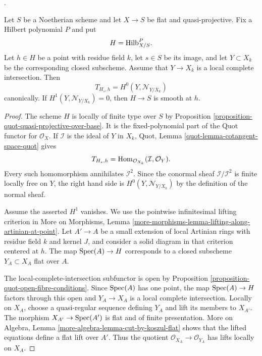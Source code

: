 \begin{proposition}
\label{proposition-hilbert-lci-tangent-smooth}
\begin{reference}
\cite[Expos\'e 221, Corollaries 5.3 and 5.4]{FGA}.
\end{reference}
Let $S$ be a Noetherian scheme and let $X \to S$ be flat and
quasi-projective. Fix a Hilbert polynomial $P$ and put
$$
H = \mathrm{Hilb}^P_{X/S}.
$$
Let $h \in H$ be a point with residue field $k$, let $s \in S$ be its
image, and let $Y \subset X_k$ be the corresponding closed subscheme.
Assume that $Y \to X_k$ is a local complete intersection. Then
$$
T_{H_s,h} = H^0(Y, \mathcal{N}_{Y/X_k})
$$
canonically. If
$H^1(Y, \mathcal{N}_{Y/X_k}) = 0$, then $H \to S$ is smooth at $h$.
\end{proposition}

\begin{proof}
The scheme $H$ is locally of finite type over $S$ by Proposition
\ref{proposition-quot-quasi-projective-over-base}. It is the fixed-polynomial
part of the Quot functor for $\mathcal{O}_X$. If $\mathcal{I}$ is the ideal
of $Y$ in $X_k$, Quot, Lemma
\ref{quot-lemma-cotangent-space-quot} gives
$$
T_{H_s,h} =
\mathop{\mathrm{Hom}}\nolimits_{\mathcal{O}_{X_k}}(\mathcal{I}, \mathcal{O}_Y).
$$
Every such homomorphism annihilates $\mathcal{I}^2$. Since the conormal
sheaf $\mathcal{I}/\mathcal{I}^2$ is finite locally free on $Y$, the right
hand side is
$H^0(Y, \mathcal{N}_{Y/X_k})$ by the definition of the normal sheaf.

Assume the asserted $H^1$ vanishes. We use the pointwise infinitesimal
lifting criterion in More on Morphisms, Lemma
\ref{more-morphisms-lemma-lifting-along-artinian-at-point}. Let
$A' \to A$ be a small extension of local Artinian rings with residue field
$k$ and kernel $J$, and consider a solid diagram in that criterion centered
at $h$. The map $\mathop{\mathrm{Spec}}(A) \to H$ corresponds to a closed subscheme
$Y_A \subset X_A$ flat over $A$.

The local-complete-intersection subfunctor is open by Proposition
\ref{proposition-quot-open-fibre-conditions}. Since $\mathop{\mathrm{Spec}}(A)$ has one
point, the map $\mathop{\mathrm{Spec}}(A) \to H$ factors through this open and
$Y_A \to X_A$ is a local complete intersection. Locally on $X_A$, choose a
quasi-regular sequence defining $Y_A$ and lift its members to $X_{A'}$.
The morphism $X_{A'} \to \mathop{\mathrm{Spec}}(A')$ is flat and of finite presentation.
More on Algebra, Lemma \ref{more-algebra-lemma-cut-by-koszul-flat} shows
that the lifted equations define a flat lift over $A'$. Thus the quotient
$\mathcal{O}_{X_A} \to \mathcal{O}_{Y_A}$ has lifts locally on $X_A$.


\end{proof}
